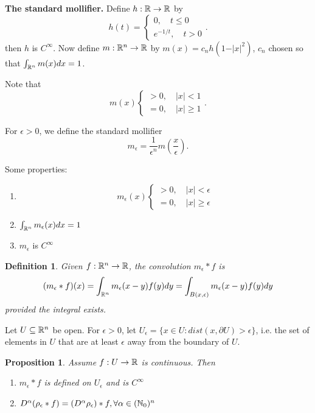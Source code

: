 \documentclass[11pt]{amsart}%
\newtheorem{proposition}[theorem]{Proposition}
\newtheorem{definition}[theorem]{Definition}
\begin{document}
{\bf The standard mollifier.} Define $h:\mathbb{R}\to\mathbb{R}$ by
$$h(t)=\begin{cases}
    0, \quad t\le 0\\
    e^{-1/t}, \quad t>0
\end{cases}.$$
then $h$ is $C^\infty$. Now define $m:\mathbb{R}^n\to \mathbb{R}$ by $m(x)=c_nh(1-\vert x\vert^2)$, $c_n$ chosen so that $\int_{\mathbb{R}^n} m(x) dx =1$.

Note that $$ m(x)\begin{cases}
    >0, \quad \vert x\vert<1\\
    =0, \quad \vert x\vert \ge 1
\end{cases}.$$

For $\epsilon>0$, we define the standard mollifier $$m_\epsilon=\frac{1}{\epsilon^n}m(\frac{x}{\epsilon}).$$

Some properties: 
\begin{enumerate}
    \item $$ m_\epsilon(x)\begin{cases}
    >0, \quad \vert x\vert<\epsilon\\
    =0, \quad \vert x\vert \ge \epsilon
\end{cases}$$
    \item $\int_{\mathbb{R}^n}m_\epsilon(x)dx =1$
    \item $m_\epsilon$ is $C^\infty$
\end{enumerate}

\begin{definition}
    Given $f:\mathbb{R}^n\to\mathbb{R}$, the convolution $m_\epsilon*f$ is
    $$(m_\epsilon * f)(x)=\int_{\mathbb{R}^n}m_\epsilon(x-y)f(y)dy = \int_{B(x,\epsilon)}m_\epsilon(x-y)f(y)dy$$ provided the integral exists.
\end{definition}
Let $U\subseteq \mathbb{R}^n$ be open. For $\epsilon>0$, let $U_\epsilon = \{x\in U: dist(x,\partial U)>\epsilon\}$, i.e. the set of elements in $U$ that are at least $\epsilon$ away from the boundary of $U$.

\begin{proposition}
    Assume $f:U\to\mathbb{R}$ is continuous. Then
    \begin{enumerate}
        \item $m_\epsilon * f$ is defined on $U_\epsilon$ and is $C^\infty$
        \item $D^\alpha(\rho_\epsilon * f)= (D^\alpha\rho_\epsilon)*f, \forall \alpha\in (\mathbb{N}_0)^n$
    \end{enumerate}
\end{proposition}
\end{document}
